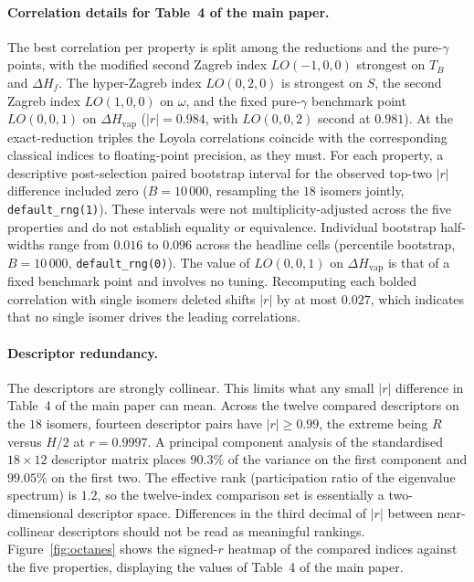 \documentclass[a5paper, 10pt]{article}
\theoremstyle{plain}
\theoremstyle{remark}
\theoremstyle{definition}
\begin{document}
\paragraph{Correlation details for Table~4 of the main paper.}
The best correlation per property is split among the reductions and
the pure-$\gamma$ points, with the modified second Zagreb index
$LO(-1, 0, 0)$ strongest on $T_B$ and $\Delta H_f$. The
hyper-Zagreb index $LO(0, 2, 0)$ is strongest on $S$, the second
Zagreb index $LO(1, 0, 0)$ on $\omega$, and the fixed pure-$\gamma$
benchmark point $LO(0, 0, 1)$ on $\Delta H_{\mathrm{vap}}$
($|r| = 0.984$, with $LO(0, 0, 2)$ second at $0.981$). At the
exact-reduction triples the Loyola correlations coincide with the
corresponding classical indices to floating-point precision, as they
must. For each property, a descriptive post-selection paired bootstrap
interval for the observed top-two $|r|$ difference included zero
($B = 10\,000$, resampling the $18$ isomers jointly,
\texttt{default\_rng(1)}). These intervals were not
multiplicity-adjusted across the five properties and do not establish
equality or equivalence. Individual bootstrap half-widths range from
$0.016$ to $0.096$ across the headline cells (percentile bootstrap,
$B = 10\,000$, \texttt{default\_rng(0)}). The value of $LO(0, 0, 1)$ on
$\Delta H_{\mathrm{vap}}$ is that of a fixed benchmark point and
involves no tuning. Recomputing each bolded correlation with single
isomers deleted shifts $|r|$ by at most $0.027$, which indicates that no
single isomer drives the leading correlations.

\paragraph{Descriptor redundancy.} The descriptors are strongly
collinear. This limits what any small $|r|$ difference in
Table~4 of the main paper can mean. Across the twelve compared
descriptors on the $18$ isomers, fourteen descriptor pairs have
$|r| \ge 0.99$, the extreme being $R$ versus $H/2$ at $r = 0.9997$. A
principal component analysis of the standardised $18 \times 12$
descriptor matrix places $90.3\%$ of the variance on the first
component and $99.05\%$ on the first two. The effective rank
(participation ratio of the eigenvalue spectrum) is $1.2$, so the
twelve-index comparison set is essentially a two-dimensional
descriptor space. Differences in the third decimal of $|r|$ between
near-collinear descriptors should not be read as meaningful rankings.
Figure~\ref{fig:octanes} shows the signed-$r$ heatmap of the compared
indices against the five properties, displaying the values of
Table~4 of the main paper.
\end{document}
